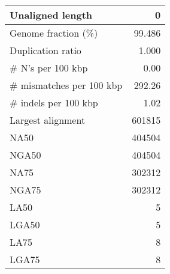\documentclass[12pt,a4paper]{article}
\begin{document}
\begin{table}[ht]
\begin{center}
\begin{tabular}{|l*{1}{|r}|}
Unaligned length & 0 \\ \hline
Genome fraction (\%) & 99.486 \\ \hline
Duplication ratio & 1.000 \\ \hline
\# N's per 100 kbp & 0.00 \\ \hline
\# mismatches per 100 kbp & 292.26 \\ \hline
\# indels per 100 kbp & 1.02 \\ \hline
Largest alignment & 601815 \\ \hline
NA50 & 404504 \\ \hline
NGA50 & 404504 \\ \hline
NA75 & 302312 \\ \hline
NGA75 & 302312 \\ \hline
LA50 & 5 \\ \hline
LGA50 & 5 \\ \hline
LA75 & 8 \\ \hline
LGA75 & 8 \\ \hline
\end{tabular}
\end{center}
\end{table}
\end{document}

